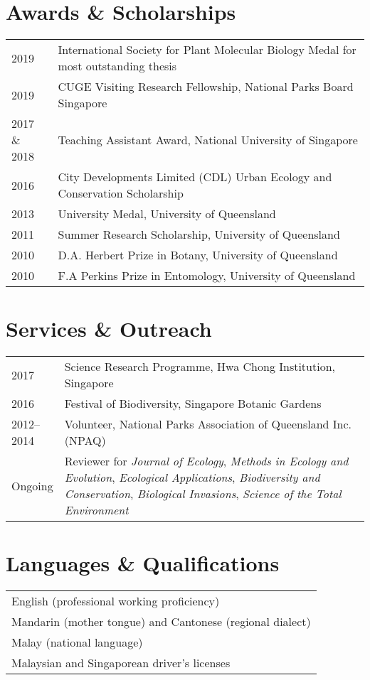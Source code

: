 \documentclass[a4paper]{article}
\begin{document}
\section*{Awards \& Scholarships}
\begin{tabular}{p{0.13\linewidth} p{0.87\linewidth}}
2019 & International Society for Plant Molecular Biology Medal for most outstanding thesis \\
2019 & CUGE Visiting Research Fellowship, National Parks Board Singapore \\
2017 \& 2018 & Teaching Assistant Award, National University of Singapore \\
2016 & City Developments Limited (CDL) Urban Ecology and Conservation Scholarship \\
2013 & University Medal, University of Queensland \\
2011 & Summer Research Scholarship, University of Queensland \\
2010 & D.A. Herbert Prize in Botany, University of Queensland \\
2010 & F.A Perkins Prize in Entomology, University of Queensland \\
\end{tabular}


\section*{Services \& Outreach}
\begin{tabular}{p{0.13\linewidth} p{0.87\linewidth}}
2017 & Science Research Programme, Hwa Chong Institution, Singapore \\
2016 & Festival of Biodiversity, Singapore Botanic Gardens \\
2012--2014 & Volunteer, National Parks Association of Queensland Inc. (NPAQ) \\
Ongoing & Reviewer for \textit{Journal of Ecology}, \textit{Methods in Ecology and Evolution}, \textit{Ecological Applications}, \textit{Biodiversity and Conservation}, \textit{Biological Invasions}, \textit{Science of the Total Environment}\\
\end{tabular}


\section*{Languages \& Qualifications}
\begin{tabular}{p{\linewidth}}
English (professional working proficiency) \\
Mandarin (mother tongue) and Cantonese (regional dialect) \\
Malay (national language) \\
Malaysian and Singaporean driver's licenses \\
\end{tabular}
\end{document}
